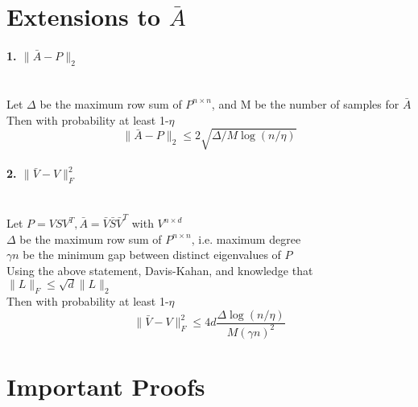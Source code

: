 \documentclass[10pt]{article}
\begin{document}
\section{Extensions to $\bar{A}$}
\paragraph{1. $\| \bar{A}-P\|_{2}$}\mbox{}\\
Let $\Delta$ be the maximum row sum of $P^{n\times n}$, and M be the number of samples for $\bar{A}$\\
Then with probability at least 1-$\eta$
\begin{equation}
\| \bar{A}-P\|_{2} \leq 2\sqrt{\Delta/M \log(n/\eta)}
\end{equation}
\paragraph{2. $\| \bar{V}-V\|_{F}^2$}\mbox{}\\
Let $P = VSV^T, \bar{A} = \bar{V}\bar{S}\bar{V}^T$ with $V^{n\times d} $\\
$\Delta$ be the maximum row sum of $P^{n\times n}$, i.e. maximum degree\\
$\gamma n$ be the minimum gap between distinct eigenvalues of $P$\\ 
Using the above statement, Davis-Kahan, and knowledge that  $\| L \|_F \leq \sqrt{d} \| L \|_{2}$\\
Then with probability at least 1-$\eta$
\begin{equation}
\| \bar{V}-V\|_{F}^2 \leq 4d\frac{\Delta \log(n/\eta)}{M(\gamma n)^2}
\end{equation}
\section{Important Proofs}
\end{document}
